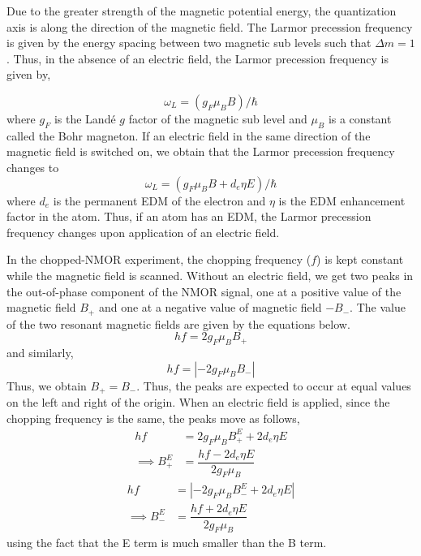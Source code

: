 Due to the greater strength of the magnetic potential energy, the quantization axis is along the direction of the magnetic field. The Larmor precession frequency is given by the energy spacing between two magnetic sub levels such that $\Delta m =1$. Thus, in the absence of an electric field, the Larmor precession frequency is given by,

\begin{equation}
\omega_L = (g_F \mu_B B)/\hbar
\end{equation}
where $g_F$ is the Land\'e $g$ factor of the magnetic sub level and $\mu_B$ is a constant called the Bohr magneton. If an electric field in the same direction of the magnetic field is switched on, we obtain that the Larmor precession frequency changes to 
\begin{equation}
\omega_L = (g_F \mu_B B + d_e \eta E)/\hbar
\end{equation}
where $d_e$ is the permanent EDM of the electron and $\eta $ is the EDM enhancement factor in the atom. 
Thus, if an atom has an EDM, the Larmor precession frequency changes upon application of an electric field.

In the chopped-NMOR experiment, the chopping frequency ($f$) is kept constant while the magnetic field is scanned. Without an electric field, we get two peaks in the out-of-phase component of the NMOR signal, one at a positive value of the magnetic field $B_+$ and one at a negative value of magnetic field $-B_-$. The value of the two resonant magnetic fields are given by the equations below.
\begin{equation}
hf=2g_F\mu_BB_+
\end{equation}
and similarly,
\begin{equation}
hf=|-2g_F\mu_BB_-|
\end{equation}
Thus, we obtain $B_+=B_-$. Thus, the peaks are expected to occur at equal values on the left and right of the origin. When an electric field is applied, since the chopping frequency is the same, the peaks move as follows,
\begin{equation*}
\begin{aligned}
hf &= 2g_F \mu_B B_+^E + 2d_e \eta E  \\
\implies B_+^E &= \dfrac{hf - 2d_e \eta E}{2g_F \mu_B} 
\end{aligned}
\end{equation*}
\begin{equation*}
\begin{aligned}
hf &= \left| -2g_F \mu_B B_-^E + 2d_e \eta E \right| \\
\implies B_-^E &= \dfrac{hf + 2d_e \eta E}{2g_F \mu_B}
\end{aligned}
\end{equation*}
using the fact that the E term is much smaller than the B term. 

